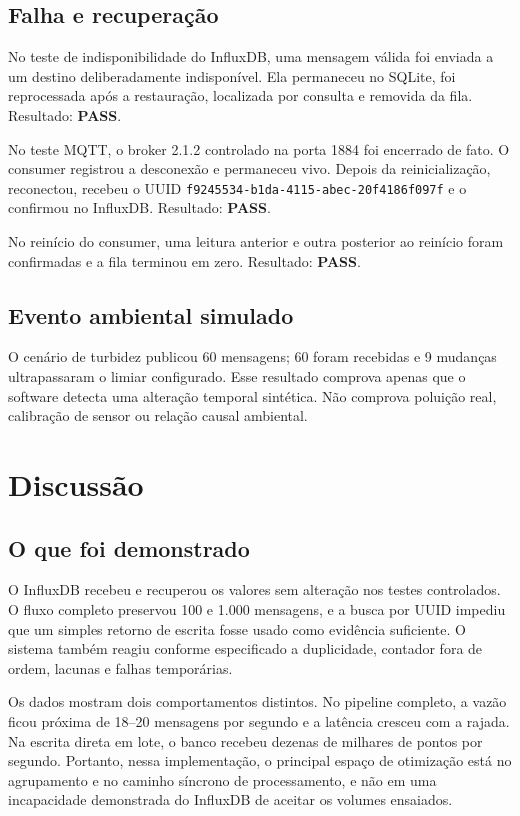 \documentclass[12pt,a4paper]{article}
\newcommand{\pass}{\textcolor{verdepass}{\textbf{PASS}}}
\newcommand{\code}[1]{\texttt{#1}}
\begin{document}
\subsection{Falha e recuperação}

No teste de indisponibilidade do InfluxDB, uma mensagem válida foi enviada a um destino deliberadamente indisponível. Ela permaneceu no SQLite, foi reprocessada após a restauração, localizada por consulta e removida da fila. Resultado: \pass.

No teste MQTT, o broker 2.1.2 controlado na porta 1884 foi encerrado de fato. O consumer registrou a desconexão e permaneceu vivo. Depois da reinicialização, reconectou, recebeu o UUID \code{f9245534-b1da-4115-abec-20f4186f097f} e o confirmou no InfluxDB. Resultado: \pass.

No reinício do consumer, uma leitura anterior e outra posterior ao reinício foram confirmadas e a fila terminou em zero. Resultado: \pass.

\subsection{Evento ambiental simulado}

O cenário de turbidez publicou 60 mensagens; 60 foram recebidas e 9 mudanças ultrapassaram o limiar configurado. Esse resultado comprova apenas que o software detecta uma alteração temporal sintética. Não comprova poluição real, calibração de sensor ou relação causal ambiental.

\section{Discussão}

\subsection{O que foi demonstrado}

O InfluxDB recebeu e recuperou os valores sem alteração nos testes controlados. O fluxo completo preservou 100 e 1.000 mensagens, e a busca por UUID impediu que um simples retorno de escrita fosse usado como evidência suficiente. O sistema também reagiu conforme especificado a duplicidade, contador fora de ordem, lacunas e falhas temporárias.

Os dados mostram dois comportamentos distintos. No pipeline completo, a vazão ficou próxima de 18--20 mensagens por segundo e a latência cresceu com a rajada. Na escrita direta em lote, o banco recebeu dezenas de milhares de pontos por segundo. Portanto, nessa implementação, o principal espaço de otimização está no agrupamento e no caminho síncrono de processamento, e não em uma incapacidade demonstrada do InfluxDB de aceitar os volumes ensaiados.
\end{document}
